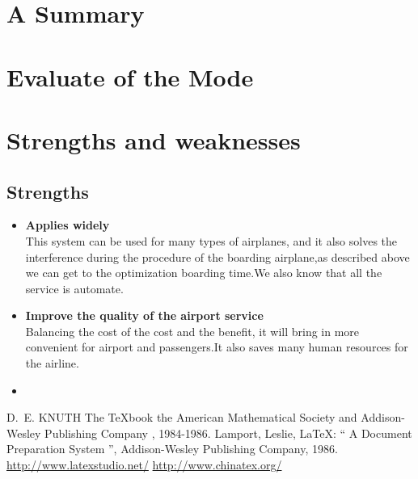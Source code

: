 \documentclass[tcn = 37075, sheet = true, abstract = true]{mcmthesis}
\begin{document}
\section{A Summary}
\lipsum[6]

\section{Evaluate of the Mode}

\section{Strengths and weaknesses}
\lipsum[12]

\subsection{Strengths}
\begin{itemize}
\item \textbf{Applies widely}\\
This  system can be used for many types of airplanes, and it also
solves the interference during  the procedure of the boarding
airplane,as described above we can get to the  optimization
boarding time.We also know that all the service is automate.
\item \textbf{Improve the quality of the airport service}\\
Balancing the cost of the cost and the benefit, it will bring in
more convenient  for airport and passengers.It also saves many
human resources for the airline. \item \textbf{}
\end{itemize}

\begin{thebibliography}{99}
 D.~E. KNUTH   The \TeX{}book  the American
Mathematical Society and Addison-Wesley
Publishing Company , 1984-1986.
Lamport, Leslie,  \LaTeX{}: `` A Document Preparation System '',
Addison-Wesley Publishing Company, 1986.
\url{http://www.latexstudio.net/}
\url{http://www.chinatex.org/}
\end{thebibliography}
\end{document}
